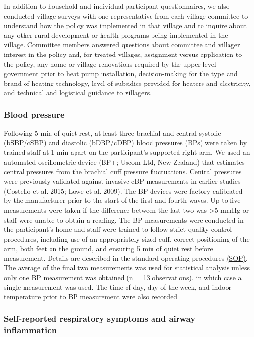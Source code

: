 \documentclass[
  letterpaper,
  DIV=11,
  numbers=noendperiod]{scrartcl}
\begin{document}
In addition to household and individual participant questionnaires, we
also conducted village surveys with one representative from each village
committee to understand how the policy was implemented in that village
and to inquire about any other rural development or health programs
being implemented in the village. Committee members answered questions
about committee and villager interest in the policy and, for treated
villages, assignment versus application to the policy, any home or
village renovations required by the upper-level government prior to heat
pump installation, decision-making for the type and brand of heating
technology, level of subsidies provided for heaters and electricity, and
technical and logistical guidance to villagers.

\subsubsection{Blood pressure}\label{blood-pressure}

Following 5 min of quiet rest, at least three brachial and central
systolic (bSBP/cSBP) and diastolic (bDBP/cDBP) blood pressures (BPs)
were taken by trained staff at 1 min apart on the participant's
supported right arm. We used an automated oscillometric device (BP+;
Uscom Ltd, New Zealand) that estimates central pressures from the
brachial cuff pressure fluctuations. Central pressures were previously
validated against invasive cBP measurements in earlier studies (Costello
et al. 2015; Lowe et al. 2009). The BP devices were factory calibrated
by the manufacturer prior to the start of the first and fourth waves. Up
to five measurements were taken if the difference between the last two
was \textgreater5 mmHg or staff were unable to obtain a reading. The BP
measurements were conducted in the participant's home and staff were
trained to follow strict quality control procedures, including use of an
appropriately sized cuff, correct positioning of the arm, both feet on
the ground, and ensuring 5 min of quiet rest before measurement. Details
are described in the standard operating procedures
\href{https://osf.io/gmka5}{(SOP)}. The average of the final two
measurements was used for statistical analysis unless only one BP
measurement was obtained (n = 13 observations), in which case a single
measurement was used. The time of day, day of the week, and indoor
temperature prior to BP measurement were also recorded.

\subsubsection{Self-reported respiratory symptoms and airway
inflammation}\label{self-reported-respiratory-symptoms-and-airway-inflammation}
\end{document}
